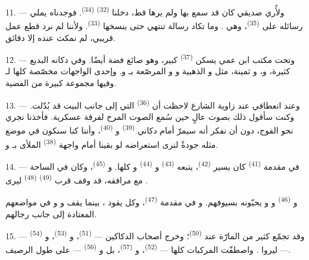11. --- ولأُري صديقي  كان قد سمع بها ولم يرها قط، دخلنا
 \textsuperscript{(32)}  \textsuperscript{(34)}. فوجدناه
يملي رسائله على  \textsuperscript{(35)}، وهي . وما
تكاد رسالة تنتهي حتى ينسخها  \textsuperscript{(33)}. ولأننا
لم نرد قطع عمل قريبي، لم نمكث عنده إلا دقائق.

12. --- وتحت مكتب ابن عمي يسكن  \textsuperscript{(37)}
كبير، وهو صائغ فضة أيضًا. وفي دكانه البديع  كثيرة، و، و ثمينة، مثل
 و الذهبية و
و المرصّعة بـ و.
وإحدى الواجهات مخصّصة كلها لـ وفيها مجموعة كبيرة من
 الفضية.

13. --- وعند انعطافي عند زاوية الشارع لاحظت أن 
\textsuperscript{(36)} التي إلى جانب  البيت قد بُدّلت. وكنت سأقول ذلك
بصوت عالٍ حين سُمع الصوت المرح لفرقة عسكرية. فأخذنا نجري نحو الفوج، دون
أن نفكر أنه سيمرّ أمام دكاني  \textsuperscript{(39)}
و \textsuperscript{(40)}، وأننا كنا سنكون في موضع مثله جودةً
لنرى استعراضه لو بقينا أمام واجهة  \textsuperscript{(38)}
الملأى بـ و.

\VUsaut{3.0mm}

14. --- في مقدمة  \textsuperscript{(41)} كان يسير  \textsuperscript{(42)}، يتبعه  \textsuperscript{(43)}
و \textsuperscript{(44)} و كلها. و
\textsuperscript{(45)}، وكان في الساحة مع مرافقه، قد وقف قرب 
\textsuperscript{(49)}  \textsuperscript{(48)} ليرى .

و \textsuperscript{(46)} و و
يحيّونه بسيوفهم. و في مقدمة  \textsuperscript{(47)}،
وكل  يقود ، بينما يقف 
و و في مواضعهم المعتادة إلى
جانب رجالهم.

15. --- وقد تجمّع كثير من المارّة عند  \textsuperscript{(50)}؛
وخرج أصحاب الدكاكين ---  \textsuperscript{(51)}،
و \textsuperscript{(53)}، و \textsuperscript{(54)} ---
ليروا . واصطفّت المركبات كلها --- 
\textsuperscript{(52)}، و \textsuperscript{(57)}، بل و \textsuperscript{(56)} --- على طول الرصيف.

